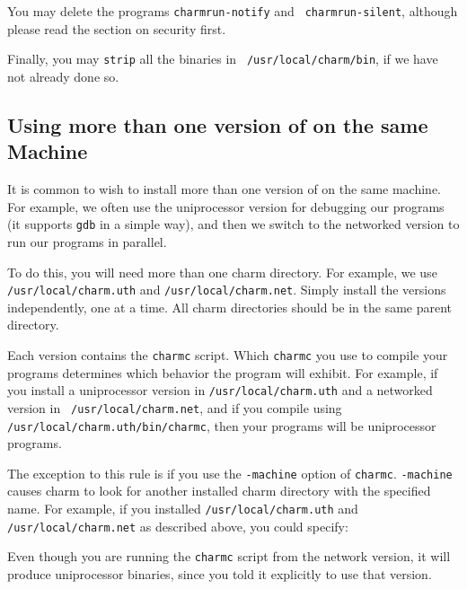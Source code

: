 \begin{alltt}
    % rm -r /usr/local/charm/pgms
\end{alltt}

You may delete the programs {\tt charmrun-notify} and {\tt
charmrun-silent}, although please read the section on security first.

Finally, you may {\tt strip} all the binaries in {\tt
/usr/local/charm/bin}, if we have not already done so.

\subsection{Using more than one version of \charmpp{} on the same Machine}

It is common to wish to install more than one version of \charmpp{} on the
same machine.  For example, we often use the uniprocessor version for
debugging our programs (it supports {\tt gdb} in a simple way), and
then we switch to the networked version to run our programs in
parallel.

To do this, you will need more than one charm directory.  For example,
we use {\tt /usr/local/charm.uth} and {\tt /usr/local/charm.net}.
Simply install the versions independently, one at a time.  All charm
directories should be in the same parent directory.

Each version contains the {\tt charmc} script.  Which {\tt charmc} you
use to compile your programs determines which behavior the program
will exhibit.  For example, if you install a uniprocessor version in
{\tt /usr/local/charm.uth} and a networked version in {\tt
/usr/local/charm.net}, and if you compile using {\tt
/usr/local/charm.uth/bin/charmc}, then your programs will be
uniprocessor programs.

The exception to this rule is if you use the {\tt -machine} option of
{\tt charmc}.  {\tt -machine} causes charm to look for another
installed charm directory with the specified name.  For example, if
you installed {\tt /usr/local/charm.uth} and {\tt
/usr/local/charm.net} as described above, you could specify:

\begin{alltt}
    % /usr/local/charm.net/bin/charmc -machine charm.uth myprog.C
\end{alltt}

Even though you are running the {\tt charmc} script from the network
version, it will produce uniprocessor binaries, since you told it
explicitly to use that version.



